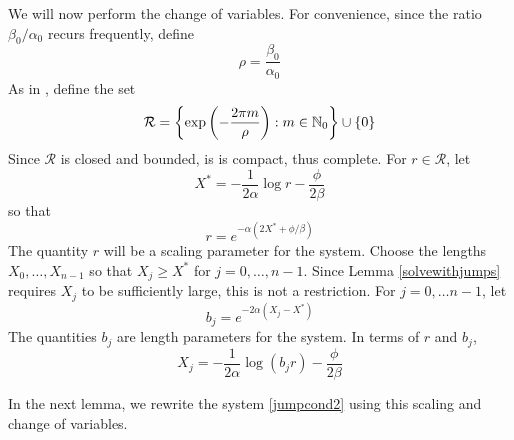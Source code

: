\documentclass[thesis.tex]{subfiles}
\begin{document}
We will now perform the change of variables. For convenience, since the ratio $\beta_0/\alpha_0$ recurs frequently, define
\begin{equation}\label{defrho}
\rho = \frac{\beta_0}{\alpha_0}
\end{equation}
As in \cite{Sandstede1998,SandstedeStrut}, define the set
\begin{align}
\mathcal{R} &= \left\{ \mathop\mathrm{exp}\nolimits\left(-\frac{2 \pi m}{\rho}\right) : m \in \mathbb{N}_0 \right\} \cup \{ 0 \}  \\
\end{align}
Since $\mathcal{R}$ is closed and bounded, is is compact, thus complete. For $r \in \mathcal{R}$, let
\begin{equation}\label{Xstar}
X^* = -\frac{1}{2\alpha}\log r - \frac{\phi}{2\beta}
\end{equation}
so that
\begin{equation}
r = e^{-\alpha(2X^* + \phi/\beta)}
\end{equation}
The quantity $r$ will be a scaling parameter for the system. Choose the lengths $X_0, \dots, X_{n-1}$ so that $X_j \geq X^*$ for $j = 0, \dots, n-1$. Since Lemma \ref{solvewithjumps} requires $X_j$ to be sufficiently large, this is not a restriction. For $j = 0, \dots n-1$, let
\begin{equation}\label{bjscale}
b_j = e^{-2 \alpha (X_j - X^*)}
\end{equation}
The quantities $b_j$ are length parameters for the system. In terms of $r$ and $b_j$,
\begin{equation}\label{Xjscale}
X_j = -\frac{1}{2\alpha}\log(b_j r) - \frac{\phi}{2 \beta}
\end{equation}

In the next lemma, we rewrite the system \eqref{jumpcond2} using this scaling and change of variables. 

\end{document}
